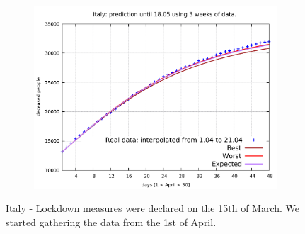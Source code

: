 \documentclass[8pt]{article}
\begin{document}
\begin{figure}[h!]
\begin{subfigure}[b]{0.45\linewidth}
  \includegraphics[width=\linewidth]{../simulations/it/1-21/1-21.pdf}
  \end{subfigure}
	\caption{Italy - Lockdown measures were declared on the 15th of March.
                We started gathering the data from the 1st of April.}
\end{figure}
\end{document}
